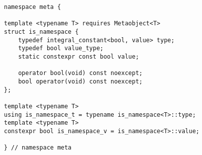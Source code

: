 
\begin{verbatim}
namespace meta {

template <typename T> requires Metaobject<T>
struct is_namespace {
	typedef integral_constant<bool, value> type;
	typedef bool value_type;
	static constexpr const bool value;

	operator bool(void) const noexcept;
	bool operator(void) const noexcept;
};

template <typename T>
using is_namespace_t = typename is_namespace<T>::type;
template <typename T>
constexpr bool is_namespace_v = is_namespace<T>::value;

} // namespace meta
\end{verbatim}
